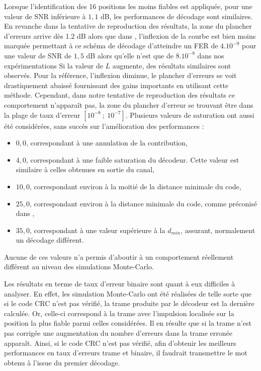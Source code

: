 Lorsque l'identification des 16 positions les moins fiables est appliquée, pour une valeur de SNR inférieure à $1,1$ dB, les 
performances de décodage sont similaires. En revanche dans la tentative de reproduction des résultats, la zone du plancher
d'erreurs arrive dès 1.2 dB alors que dans \cite{cim}, l'inflexion de la courbe est bien moins marquée permettant à ce 
schéma de décodage d'atteindre un FER de $4.10^{-9}$ pour une valeur de SNR de $1,5$ dB alors qu'elle n'est que de $8.10^{-8}$
dans nos expérimentations Si la valeur de $L$ augmente, des résultats similaires sont observés. Pour la référence, 
l'inflexion diminue, le plancher d'erreurs se voit drastiquement abaissé fournissant des gains importants en utilisant
cette méthode. Cependant, dans notre tentative de reproduction des résultats ce comportement n’apparaît pas, la zone du 
plancher d'erreur se trouvant être dans la plage de taux d'erreur $[10^{-8}~;~10^{-7}]$. Plusieurs valeurs de saturation 
ont aussi été considérées, sans succès sur l'amélioration des performances :
\begin{itemize}
	\item $0,0$, correspondant à une annulation de la contribution, 
	\item $4,0$, correspondant à une faible saturation du décodeur. Cette valeur est similaire à celles obtenues en sortie du canal,
	\item $10,0$, correspondant environ à la moitié de la distance minimale du code,
	\item $25,0$, correspondant environ à la distance minimale du code, comme préconisé dans \cite{cim, fsm},
	\item $35,0$, correspondant à une valeur supérieure à la $d_{min}$, assurant, normalement un décodage différent.
\end{itemize}
Aucune de ces valeurs n'a permis d'aboutir à un comportement réellement différent au niveau des simulations Monte-Carlo.

Les résultats en terme de taux d'erreur binaire sont quant à eux difficiles à analyser. En effet, les simulation Monte-Carlo 
ont été réalisées de telle sorte que si le code CRC n'est pas vérifié, la trame produite par le décodeur est la dernière calculée.
Or, celle-ci correspond à la trame avec l'impulsion localisée sur la position la plus fiable parmi celles considérées. 
Il en résulte que si la trame n'est pas corrigée une augmentation du nombre d'erreurs dans la trame erronée apparaît. Ainsi, 
si le code CRC n'est pas vérifié, afin d'obtenir les meilleurs performances en taux d'erreurs trame et binaire, il faudrait 
transmettre le mot obtenu à l'issue du premier décodage.

